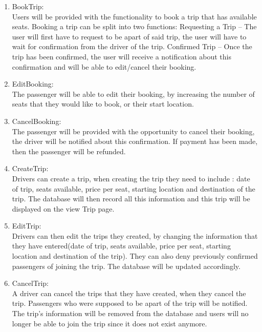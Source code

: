 \documentclass[hidelinks, 12pt, a4paper]{article}
\begin{document}
\begin{enumerate}[label=U1.\arabic*]
\begin{enumerate}[label=U1.\arabic*]
                \item BookTrip:\\
                Users will be provided with the functionality to book a trip that has available seats. Booking a trip can be split into two functions: 
                Requesting a Trip – The user will first have to request to be apart of said trip, the user will have to wait for confirmation from the driver of the trip.
                Confirmed Trip – Once the trip has been confirmed, the user will receive a notification about this confirmation and will be able to edit/cancel their booking.\\

                \item EditBooking:\\
                The passenger will be able to edit their booking, by increasing the number of seats that they would like to book, or their start location.\\
                	
                \item CancelBooking: \\
                The passenger will be provided with the opportunity to cancel their booking, the driver will be notified about this confirmation. If payment has been made, then the passenger will be refunded.\\
                    
                \item CreateTrip:\\
                Drivers can create a  trip, when creating the trip they need to include : date of trip, seats available, price per seat, starting location and destination of the trip. The database will then record all this information and this trip will be displayed on the view Trip page.\\
                    
                \item EditTrip:\\
                Drivers can then edit the trips they created, by changing the information that they have entered(date of trip, seats available, price per seat, starting location and destination of the trip). They can also deny previously confirmed passengers of joining the trip. The database will be updated accordingly.\\

                \item CancelTrip:\\
                A driver can cancel the trips that they have created, when they cancel the trip. Passengers who were supposed to be apart of the trip will be notified. The trip’s information will be removed from the database and users will no longer be able to join the trip since it does not exist anymore.\\
                	

\end{enumerate}
\end{enumerate}
\end{document}
